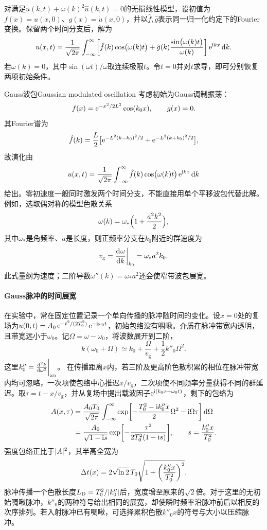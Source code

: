 对满足$\ddot{\hat u}(k,t) + \omega(k)^2\hat u(k,t) = 0$的无损线性模型，设初值为$f(x) = u(x,0)$、$g(x) = \dot u(x,0)$，并以$\hat f,\hat g$表示同一归一化约定下的Fourier变换。保留两个时间分支后，解为
\[
    u(x,t) = \frac1{\sqrt{2\pi}}\intR
    \biggb{\hat f(k)\cos\bigp{\omega(k)t}
    + \hat g(k)\frac{\sin\bigp{\omega(k)t}}{\omega(k)}}\e^{\i kx}\d k.
\]
若$\omega(k) = 0$，其中$\sin(\omega t)/\omega$取连续极限$t$。令$t = 0$并对$t$求导，即可分别恢复两项初始条件。
\begin{example}{Gauss波包}{Gaussian modulated oscillation}
    考虑初始为Gauss调制振荡：
    \[
        f(x) = \e^{-x^2/2L^2}\cos(k_0x),\qquad g(x) = 0.
    \]
    其Fourier谱为
    \[
        \hat f(k) = \frac L2\bigb{\e^{-L^2(k-k_0)^2/2} + \e^{-L^2(k+k_0)^2/2}},
    \]
    故演化由
    \[
        u(x,t) = \frac1{\sqrt{2\pi}}\intR\hat f(k)\cos\bigp{\omega(k)t}\e^{\i kx}\d k
    \]
    给出。零初速度一般同时激发两个时间分支，不能直接用单个平移波包代替此解。
    \tcblower
    例如，选取偶对称的模型色散关系
    \[
        \omega(k) = \omega_\ast\Bigp{1 + \frac{a^2k^2}2},
    \]
    其中$\omega_\ast$是角频率、$a$是长度，则正频率分支在$k_0$附近的群速度为
    \[
        v_{\mathrm{g}} = \biggeval{\dv\omega k}_{k_0} = \omega_\ast a^2k_0.
    \]
    此式量纲为速度；二阶导数$\omega''(k) = \omega_\ast a^2$还会使窄带波包展宽。
\end{example}

\paragraph{Gauss脉冲的时间展宽}
在实验中，常在固定位置记录一个单向传播的脉冲随时间的变化。设$x = 0$处的复场为$u(0,t) = A_0\e^{-t^2/(2T_0^2)}\e^{-\i\omega_0t}$，初始包络没有啁啾。介质在脉冲带宽内透明，且带宽远小于$\omega_0$。记$\Omega = \omega - \omega_0$，将波数展开到二阶，
\begin{equation}
    \label{eq:ed-dispersion-expansion-frequency}
    k(\omega_0 + \Omega) \simeq k_0 + \frac{\Omega}{v_{\mathrm g}} + \frac12 k''_0\Omega^2.
\end{equation}
这里$k''_0 = \biggeval{\dv[2]k\omega}_{\omega_0}$。
在传播距离$x$内，若三阶及更高阶色散积累的相位在脉冲带宽内均可忽略，一次项使包络中心推迟$x/v_{\mathrm g}$，二次项使不同频率分量获得不同的群延迟。取$\tau = t - x/v_{\mathrm g}$，并从复场中提出载波因子$\e^{\i(k_0x-\omega_0t)}$，剩下的包络为
\begin{align*}
    A(x,\tau)
    &= \frac{A_0 T_0}{\sqrt{2\pi}}\intR
    \exp\biggb{-\frac{T_0^2 - \i k''_0x}{2}\Omega^2 - \i\Omega\tau}\d\Omega\\
    &= \frac{A_0}{\sqrt{1 - \i s}}\exp\biggb{-\frac{\tau^2}{2T_0^2(1 - \i s)}},
    \qquad s = \frac{k''_0x}{T_0^2}.
\end{align*}
强度包络正比于$\abs{A}^2$，其半高全宽为
\begin{equation}
    \Delta t(x) = 2\sqrt{\ln 2}\,T_0
        \sqrt{1 + \biggp{\frac{k''_0x}{T_0^2}}^2}.
\end{equation}
脉冲传播一个色散长度$L_{\mathrm D} = T_0^2/\abs{k''_0}$后，宽度增至原来的$\sqrt2$倍。对于这里的无初始啁啾脉冲，$k''_0$的两种符号给出相同的展宽，却使瞬时频率沿脉冲前后以相反的次序排列。若入射脉冲已有啁啾，可选择累积色散$k''_0x$的符号与大小以压缩脉冲。

